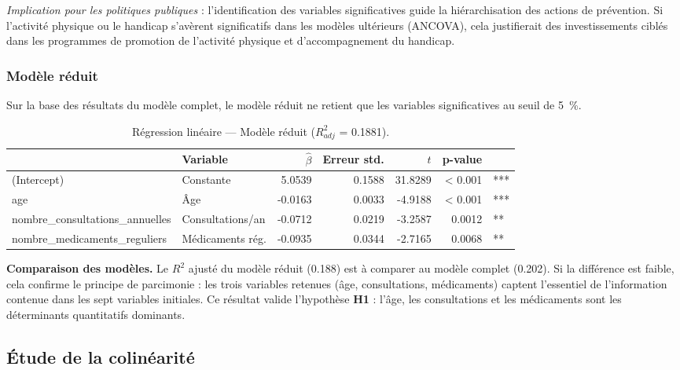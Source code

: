 \documentclass[11pt,a4paper]{memoirerecherche}
\begin{document}
\emph{Implication pour les politiques publiques} : l'identification des variables significatives guide la hiérarchisation des actions de prévention. Si l'activité physique ou le handicap s'avèrent significatifs dans les modèles ultérieurs (ANCOVA), cela justifierait des investissements ciblés dans les programmes de promotion de l'activité physique et d'accompagnement du handicap.

\hypertarget{moduxe8le-ruxe9duit}{%
\subsubsection{Modèle réduit}\label{moduxe8le-ruxe9duit}}

Sur la base des résultats du modèle complet, le modèle réduit ne retient que les variables significatives au seuil de 5~\%.

\begin{table}[!h]
\centering
\caption{\label{tab:tab-reg-reduit}Régression linéaire --- Modèle réduit ($R^2_{adj}$ = 0.1881).}
\centering
\fontsize{9}{11}\selectfont
\begin{tabular}[t]{llrrrrl}
\toprule
  & Variable & $\hat{\beta}$ & Erreur std. & $t$ & p-value & \\
\midrule
(Intercept) & Constante & 5.0539 & 0.1588 & 31.8289 & < 0.001 & ***\\
age & Âge & -0.0163 & 0.0033 & -4.9188 & < 0.001 & ***\\
nombre_consultations_annuelles & Consultations/an & -0.0712 & 0.0219 & -3.2587 & 0.0012 & **\\
nombre_medicaments_reguliers & Médicaments rég. & -0.0935 & 0.0344 & -2.7165 & 0.0068 & **\\
\bottomrule
\end{tabular}
\end{table}

\textbf{Comparaison des modèles.} Le \(R^2\) ajusté du modèle réduit (0.188) est à comparer au modèle complet (0.202). Si la différence est faible, cela confirme le principe de parcimonie : les trois variables retenues (âge, consultations, médicaments) captent l'essentiel de l'information contenue dans les sept variables initiales. Ce résultat valide l'hypothèse \textbf{H1} : l'âge, les consultations et les médicaments sont les déterminants quantitatifs dominants.

\hypertarget{sec-colinearite}{%
\subsection{Étude de la colinéarité}\label{sec-colinearite}}
\end{document}
